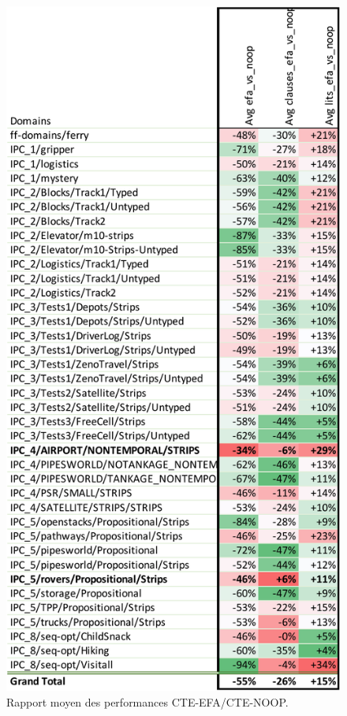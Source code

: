 \begin{figure}[ht!] \centering
\begin{center} \includegraphics[width=.75\textwidth]{figures/experiment-efa_vs_noop-crop.pdf} \end{center}
\caption{Rapport moyen des performances CTE-EFA/CTE-NOOP.}
\label{fig:tab-exp-efa-vs-noop}
\end{figure}

